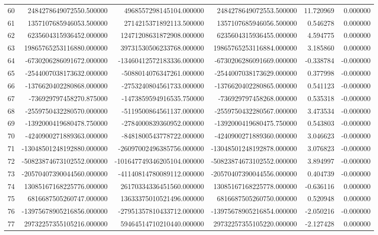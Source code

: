 \begin{tabular}{lrrrrr}
60 & 2484278649072550.500000 & 4968557298145104.000000 & 2484278649072553.500000 & 11.720969 & 0.000000 \\
61 & 1357107685946053.500000 & 2714215371892113.500000 & 1357107685946056.500000 & 0.546278 & 0.000000 \\
62 & 6235604315936452.000000 & 12471208631872908.000000 & 6235604315936455.000000 & 4.594775 & 0.000000 \\
63 & 19865765253116880.000000 & 39731530506233768.000000 & 19865765253116884.000000 & 3.185860 & 0.000000 \\
64 & -6730206286091672.000000 & -13460412572183336.000000 & -6730206286091669.000000 & -0.338784 & -0.000000 \\
65 & -2544007038173632.000000 & -5088014076347261.000000 & -2544007038173629.000000 & 0.377998 & -0.000000 \\
66 & -1376620402280868.000000 & -2753240804561733.000000 & -1376620402280865.000000 & 0.541123 & -0.000000 \\
67 & -736929797458270.875000 & -1473859594916535.750000 & -736929797458268.000000 & 0.535318 & -0.000000 \\
68 & -2559750432280570.000000 & -5119500864561137.000000 & -2559750432280567.000000 & 3.473534 & -0.000000 \\
69 & -1392000419680478.750000 & -2784000839360952.000000 & -1392000419680475.750000 & 0.543803 & -0.000000 \\
70 & -4240900271889363.000000 & -8481800543778722.000000 & -4240900271889360.000000 & 3.046623 & -0.000000 \\
71 & -13048501248192880.000000 & -26097002496385756.000000 & -13048501248192878.000000 & 3.076823 & -0.000000 \\
72 & -50823874673102552.000000 & -101647749346205104.000000 & -50823874673102552.000000 & 3.894997 & -0.000000 \\
73 & -20570407390044560.000000 & -41140814780089112.000000 & -20570407390044556.000000 & 0.404739 & -0.000000 \\
74 & 13085167168225776.000000 & 26170334336451560.000000 & 13085167168225778.000000 & -0.636116 & 0.000000 \\
75 & 6816687505260747.000000 & 13633375010521496.000000 & 6816687505260750.000000 & 0.520948 & 0.000000 \\
76 & -13975678905216856.000000 & -27951357810433712.000000 & -13975678905216854.000000 & -2.050216 & -0.000000 \\
77 & 29732257355105216.000000 & 59464514710210440.000000 & 29732257355105220.000000 & -2.127428 & 0.000000 \\

\end{tabular}
